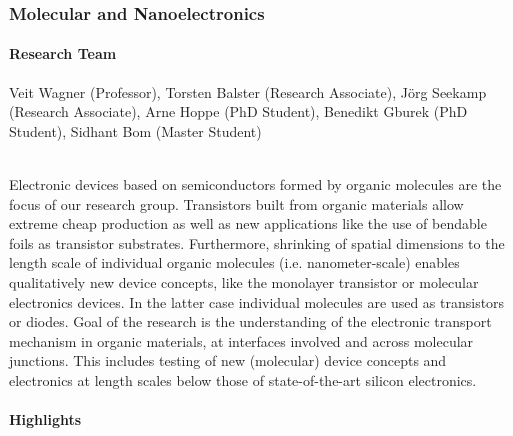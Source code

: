 \subsubsection{Molecular and Nanoelectronics}

\paragraph{Research Team}
Veit Wagner (Professor),  Torsten Balster (Research Associate),
J\"{o}rg Seekamp (Research Associate), Arne Hoppe (PhD Student),
Benedikt Gburek (PhD Student), Sidhant Bom (Master Student) \ \ \\
\


Electronic devices based on semiconductors formed by organic molecules
are the focus of our research group. Transistors built from organic
materials allow extreme cheap production as well as new applications
like the use of bendable foils as transistor substrates. Furthermore,
shrinking of spatial dimensions to the length scale of individual
organic molecules (i.e. nanometer-scale) enables qualitatively new
device concepts, like the monolayer transistor or molecular
electronics devices. In the latter case individual molecules are used
as transistors or diodes. Goal of the research is the understanding of
the electronic transport mechanism in organic materials, at interfaces
involved and across molecular junctions. This includes testing of new
(molecular) device concepts and electronics at length scales below
those of state-of-the-art silicon electronics.

\paragraph{Highlights}


